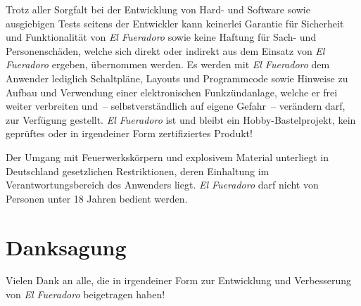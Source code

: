 \documentclass[pdftex, parskip, numbers=noenddot, toc=listof]{scrbook}
\newcommand{\anlage}{\emph{El Fueradoro}}
\begin{document}
	Trotz aller Sorgfalt bei der Entwicklung von Hard- und Software sowie ausgiebigen Tests seitens der Entwickler kann keinerlei Garantie für Sicherheit und Funktionalität von {\anlage} sowie keine Haftung für Sach- und Personenschäden, welche sich direkt oder indirekt aus dem Einsatz von {\anlage} ergeben, übernommen werden. Es werden mit {\anlage} dem Anwender lediglich Schaltpläne, Layouts und Programmcode sowie Hinweise zu Aufbau und Verwendung einer elektronischen Funkzündanlage, welche er frei weiter verbreiten und~-- selbstverständlich auf eigene Gefahr~-- verändern darf, zur Verfügung gestellt. {\anlage} ist und bleibt ein Hobby-Bastelprojekt, kein geprüftes oder in irgendeiner Form zertifiziertes Produkt!

	Der Umgang mit Feuerwerkskörpern und explosivem Material unterliegt in Deutschland gesetzlichen Restriktionen, deren Einhaltung im Verantwortungsbereich des Anwenders liegt. {\anlage} darf nicht von Personen unter 18 Jahren bedient werden.

	\chapter*{Danksagung}%

	Vielen Dank an alle, die in irgendeiner Form zur Entwicklung und Verbesserung von {\anlage} beigetragen haben!
\end{document}
